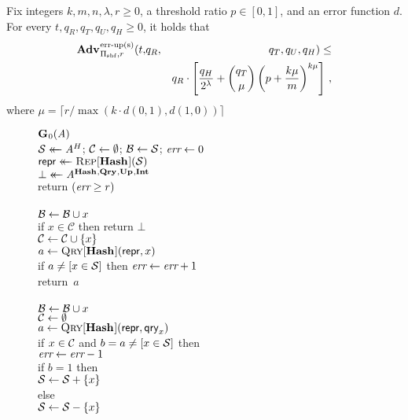 \begin{theorem}\label{thm:count-bf-bound}
Fix integers $k, m, n, \lambda, r\geq 0$, a threshold ratio $p \in [0,1]$, and an error function $d$.
  For every $t, q_R, q_T, q_U, q_H \geq 0$, it holds that
  \begin{eqnarray*}
    \Adv{\erreps}_{\struct_\saltybloom,r}(t,&q_R,& q_T, q_U, q_H) \leq \\ && q_R \cdot \left[\frac{q_H}{2^\lambda} + \binom{q_T}{\mu}\left(p+\frac{k\mu}{m}\right)^{k\mu}\right] \,,
\end{eqnarray*}
where $\mu = \lceil r/\max(k \cdot d(0,1), d(1,0)) \rceil$
\end{theorem}

\begin{figure*}
  {
    \underline{$\mathbf{G}\hspace{0.5pt}_0(\mathit{A})$}\\[2pt]
      $\mathcal{S} \mathrel{\leftarrow\mkern-14mu\leftarrow} \mathit{A}^H$; $\mathcal{C} \gets \emptyset$; $\mathcal{B} \gets \mathcal{S}$; $\textit{err} \gets 0$\\
      $\mathsf{repr} \mathrel{\leftarrow\mkern-14mu\leftarrow} \textsc{Rep}[\mathbf{Hash}\hspace{0.5pt}](\mathcal{S})$\\
      $\bot \mathrel{\leftarrow\mkern-14mu\leftarrow} \mathit{A}^{\mathbf{Hash}\hspace{0.5pt},\mathbf{Qry}\hspace{0.5pt},\mathbf{Up}\hspace{0.5pt},\mathbf{Int}\hspace{0.5pt}}$\\
      return $(\textit{err} \geq r)$
    \\[6pt]
    \\[2pt]
      $\mathcal{B} \gets \mathcal{B} \cup x$\\
      if $x \in \mathcal{C}$ then return $\bot$\\
      $\mathcal{C} \gets \mathcal{C} \cup \{x\}$\\
      $a \gets \textsc{Qry}[\mathbf{Hash}\hspace{0.5pt}](\mathsf{repr}, x)$\\
      if $a \neq [x \in \mathcal{S}]$ then $\textit{err} \gets \textit{err} + 1$\\
      return~$a$
    \\[6pt]
    \\[2pt]
      $\mathcal{B} \gets \mathcal{B} \cup x$\\
      $\mathcal{C} \gets \emptyset$\\
      $a \gets \textsc{Qry}[\mathbf{Hash}\hspace{0.5pt}](\mathsf{repr}, \mathsf{qry}_x)$\\
      if $x \in \mathcal{C}$ and $b = a \neq [x \in \mathcal{S}]$ then\\
      \tab $\textit{err} \gets \textit{err}-1$\\
      if $b = 1$ then\\
      \tab $\mathcal{S} \gets \mathcal{S} + \{x\}$\\
      else\\
      \tab $\mathcal{S} \gets \mathcal{S} - \{x\}$\\
}
\end{figure*}
